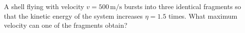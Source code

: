 \item A shell flying with velocity \( v = 500 \, \text{m/s} \) bursts into three identical fragments so that the kinetic energy of the system increases \( \eta = 1.5 \) times. What maximum velocity can one of the fragments obtain?
